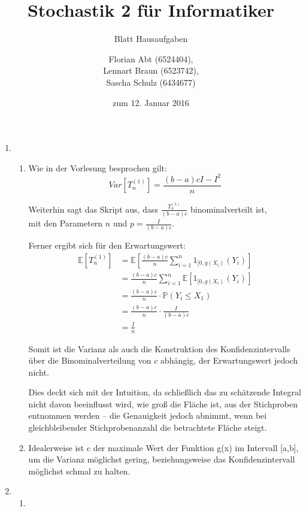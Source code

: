 \documentclass[a4paper]{scrartcl}
\title{Stochastik 2 für Informatiker}
\subtitle{Blatt {\blattnr} Hausaufgaben}
\author{
    Florian Abt (6524404), \\
    Lennart Braun (6523742), \\
    Sascha Schulz (6434677)
}
\date{zum 12. Januar 2016}
\def \blattnr {11}
\begin{document}
\maketitle

\begin{enumerate}[label=\bfseries \blattnr.\arabic*]
  \item %
    \begin{enumerate}
     \item %
         Wie in der Vorlesung besprochen gilt:
         $$Var\left[T_n^{(1)}\right] = \frac{(b-a)cI - I^2}{n}$$
         
         Weiterhin sagt das Skript aus, dass $\frac{T_n^{(1)}}{(b-a)c}$ 
         binominalverteilt ist, 
         \\ mit den Parametern $n$ und $p=\frac I{(b-a)c}$.
         
         Ferner ergibt sich für den Erwartungswert:
         \begin{equation*}
	  \begin{split}
	    \mathbb{E}\left[T_n^{(1)}\right] 
	    &= \mathbb{E}\left[ \frac{(b-a)c}n \sum_{i=1}^n 1_{[0,g(X_i)}(Y_i) \right] \\
	    &= \frac{(b-a)c}n \sum_{i=1}^n \mathbb{E}\left[1_{[0,g(X_i)}(Y_i) \right] \\
	    &= \frac{(b-a)c}n \cdot \mathbb{P}(Y_i\leq X_1) \\
	    &= \frac{(b-a)c}n \cdot \frac{I}{(b-a)c} \\
	    &= \frac{I}n
	  \end{split}
         \end{equation*}
	 
	 Somit ist die Varianz als auch die Konstruktion des Konfidenzintervalls 
	 über die Binominalverteilung von $c$ abhängig, 
	 der Erwartungswert jedoch nicht. 
	 
	 Dies deckt sich mit der Intuition, da 
	 schließlich das zu schätzende Integral nicht davon beeinflusst wird, 
	 wie groß die Fläche ist, aus der Stichproben entnommen werden -- die 
	 Genauigkeit jedoch abnimmt, wenn bei gleichbleibender Stichprobenanzahl
	 die betrachtete Fläche steigt.
     
     \item %
	 Idealerweise ist c der maximale Wert der Funktion g(x) im Intervall 
	 [a,b], um die Varianz möglichst gering, beziehungsweise das 
	 Konfidenzintervall möglichst schmal zu halten.
     
    \end{enumerate}
  \item %
    \begin{enumerate}
     \item %
         
         

\end{enumerate}
\end{enumerate}
\end{document}
